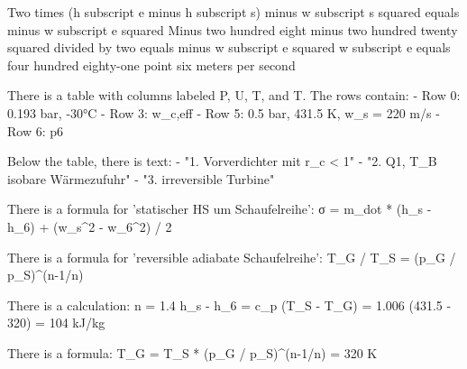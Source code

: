 Two times (h subscript e minus h subscript s) minus w subscript s squared equals minus w subscript e squared  
Minus two hundred eight minus two hundred twenty squared divided by two equals minus w subscript e squared  
w subscript e equals four hundred eighty-one point six meters per second

There is a table with columns labeled P, U, T, and T. The rows contain:
- Row 0: 0.193 bar, -30°C
- Row 3: w_c,eff
- Row 5: 0.5 bar, 431.5 K, w_s = 220 m/s
- Row 6: p6

Below the table, there is text:
- "1. Vorverdichter mit r_c < 1"
- "2. Q1, T_B isobare Wärmezufuhr"
- "3. irreversible Turbine"

There is a formula for 'statischer HS um Schaufelreihe':
σ = m_dot * (h_s - h_6) + (w_s^2 - w_6^2) / 2

There is a formula for 'reversible adiabate Schaufelreihe':
T_G / T_S = (p_G / p_S)^(n-1/n)

There is a calculation:
n = 1.4
h_s - h_6 = c_p (T_S - T_G)
= 1.006 (431.5 - 320)
= 104 kJ/kg

There is a formula:
T_G = T_S * (p_G / p_S)^(n-1/n) = 320 K